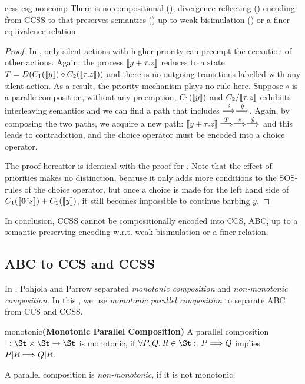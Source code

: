 \documentclass[adraft,hidelinks]{eptcs}
\begin{document}
\begin{proposition}{ccss-csg-noncomp}
  There is no compositional (), divergence-reflecting () encoding from CCSS to \CSG that preserves semantics () up to weak bisimulation () or a finer equivalence relation.
\end{proposition}

\begin{proof}
  In \CSG, only silent actions with higher priority can preempt the ecexution of other actions.
  Again, the process $\bkt{y+\tau.z}$ reduces to a state $T=D(C_1(\bkt y)\circ C_2(\bkt{\tau.z}))$ and there is no outgoing transitions labelled with any silent action.
  As a result, the priority mechanism plays no rule here.
  Suppose $\circ$ is a paralle composition, without any preemption, $C_1(\bkt y)$ and $C_2/\bkt{\tau.z}$ exhibiits interleaving semantics and we can find a path that includes $\overset{\hat{z}}{\Longrightarrow}\overset{\hat{y}}{\Longrightarrow}$.
  Again, by composing the two paths, we acquire a new path: $\bkt{y+\tau.z}\vred T \hvred{z}\hvred{y}$ and this leads to contradiction, and the choice operator must be encoded into a choice operator.

  The proof hereafter is identical with the proof for .
  Note that the effect of priorities makes no distinction, because it only adds more conditions to the SOS-rules of the choice operator, but once a choice is made for the left hand side of $C_1(\bkt{\nil\signals s}) + C_2(\bkt y)$, it still becomes impossible to continue barbing $y$.
\end{proof}

In conclusion, CCSS cannot be compositionally encoded into CCS, ABC, \CSG up to a semantic-preserving encoding w.r.t. weak bisimulation or a finer relation.

\subsection{ABC to CCS and CCSS}
\label{sec:abc-ccs}
In \cite{PP16}, Pohjola and Parrow separated \emph{monotonic composition} and \emph{non-monotonic composition}.
In this \this, we use \emph{monotonic parallel composition} to separate ABC from CCS and CCSS.

\begin{definition}{monotonic}\textbf{(Monotonic Parallel Composition)}
  A parallel composition $| : \St\times\St\to\St$ is monotonic, if $\forall P, Q, R\in \St:\ P\vred{}Q$ implies $P|R\overset{}{\Longrightarrow}Q|R$.

  A parallel composition is \emph{non-monotonic}, if it is not monotonic.
\end{definition}
\end{document}
